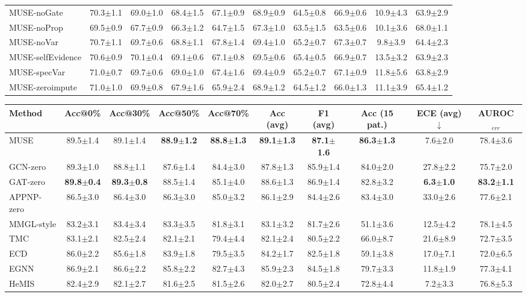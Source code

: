 \begin{tabular}{lccccccccc}
MUSE-noGate & 70.3$\pm$1.1 & 69.0$\pm$1.0 & 68.4$\pm$1.5 & 67.1$\pm$0.9 & 68.9$\pm$0.9 & 64.5$\pm$0.8 & 66.9$\pm$0.6 & 10.9$\pm$4.3 & 63.9$\pm$2.9 \\
MUSE-noProp & 69.5$\pm$0.9 & 67.7$\pm$0.9 & 66.3$\pm$1.2 & 64.7$\pm$1.5 & 67.3$\pm$1.0 & 63.5$\pm$1.5 & 63.5$\pm$0.6 & 10.1$\pm$3.6 & 68.0$\pm$1.1 \\
MUSE-noVar & 70.7$\pm$1.1 & 69.7$\pm$0.6 & 68.8$\pm$1.1 & 67.8$\pm$1.4 & 69.4$\pm$1.0 & 65.2$\pm$0.7 & 67.3$\pm$0.7 & 9.8$\pm$3.9 & 64.4$\pm$2.3 \\
MUSE-selfEvidence & 70.6$\pm$0.9 & 70.1$\pm$0.4 & 69.1$\pm$0.6 & 67.1$\pm$0.8 & 69.5$\pm$0.6 & 65.4$\pm$0.5 & 66.9$\pm$0.7 & 13.5$\pm$3.2 & 63.9$\pm$2.3 \\
MUSE-specVar & 71.0$\pm$0.7 & 69.7$\pm$0.6 & 69.0$\pm$1.0 & 67.4$\pm$1.6 & 69.4$\pm$0.9 & 65.2$\pm$0.7 & 67.1$\pm$0.9 & 11.8$\pm$5.6 & 63.8$\pm$2.9 \\
MUSE-zeroimpute & 71.0$\pm$1.0 & 69.9$\pm$0.8 & 67.9$\pm$1.6 & 65.9$\pm$2.4 & 68.9$\pm$1.2 & 64.5$\pm$1.2 & 66.0$\pm$1.3 & 11.1$\pm$3.9 & 65.4$\pm$1.2 \\
\bottomrule
\end{tabular}
\begin{tabular}{lccccccccc}
\toprule
Method & Acc@0\% & Acc@30\% & Acc@50\% & Acc@70\% & Acc (avg) & F1 (avg) & Acc (15 pat.) & ECE (avg)$\downarrow$ & AUROC$_{err}$ \\
\midrule
MUSE & 89.5$\pm$1.4 & 89.1$\pm$1.4 & \textbf{88.9$\pm$1.2} & \textbf{88.8$\pm$1.3} & \textbf{89.1$\pm$1.3} & \textbf{87.1$\pm$1.6} & \textbf{86.3$\pm$1.3} & 7.6$\pm$2.0 & 78.4$\pm$3.6 \\
GCN-zero & 89.3$\pm$1.0 & 88.8$\pm$1.1 & 87.6$\pm$1.4 & 84.4$\pm$3.0 & 87.8$\pm$1.3 & 85.9$\pm$1.4 & 84.0$\pm$2.0 & 27.8$\pm$2.2 & 75.7$\pm$2.0 \\
GAT-zero & \textbf{89.8$\pm$0.4} & \textbf{89.3$\pm$0.8} & 88.5$\pm$1.4 & 85.1$\pm$4.0 & 88.6$\pm$1.3 & 86.9$\pm$1.4 & 82.8$\pm$3.2 & \textbf{6.3$\pm$1.0} & \textbf{83.2$\pm$1.1} \\
APPNP-zero & 86.5$\pm$3.0 & 86.4$\pm$3.0 & 86.3$\pm$3.0 & 85.0$\pm$3.2 & 86.1$\pm$2.9 & 84.4$\pm$2.6 & 83.4$\pm$3.0 & 33.0$\pm$2.6 & 77.6$\pm$2.1 \\
MMGL-style & 83.2$\pm$3.1 & 83.4$\pm$3.4 & 83.3$\pm$3.5 & 81.8$\pm$3.1 & 83.1$\pm$3.2 & 81.7$\pm$2.6 & 51.1$\pm$3.6 & 12.5$\pm$4.2 & 78.1$\pm$4.5 \\
TMC & 83.1$\pm$2.1 & 82.5$\pm$2.4 & 82.1$\pm$2.1 & 79.4$\pm$4.4 & 82.1$\pm$2.4 & 80.5$\pm$2.2 & 66.0$\pm$8.7 & 21.6$\pm$8.9 & 72.7$\pm$3.5 \\
ECD & 86.0$\pm$2.2 & 85.6$\pm$1.8 & 83.9$\pm$1.8 & 79.5$\pm$3.5 & 84.2$\pm$1.7 & 82.5$\pm$1.8 & 59.1$\pm$3.8 & 17.0$\pm$7.1 & 72.0$\pm$6.5 \\
EGNN & 86.9$\pm$2.1 & 86.6$\pm$2.2 & 85.8$\pm$2.2 & 82.7$\pm$4.3 & 85.9$\pm$2.3 & 84.5$\pm$1.8 & 79.7$\pm$3.3 & 11.8$\pm$1.9 & 77.3$\pm$4.1 \\
HeMIS & 82.4$\pm$2.9 & 82.1$\pm$2.7 & 81.6$\pm$2.5 & 81.5$\pm$2.6 & 82.0$\pm$2.7 & 80.5$\pm$2.4 & 72.8$\pm$4.4 & 7.2$\pm$3.3 & 76.8$\pm$5.3 \\
\midrule
\bottomrule
\end{tabular}